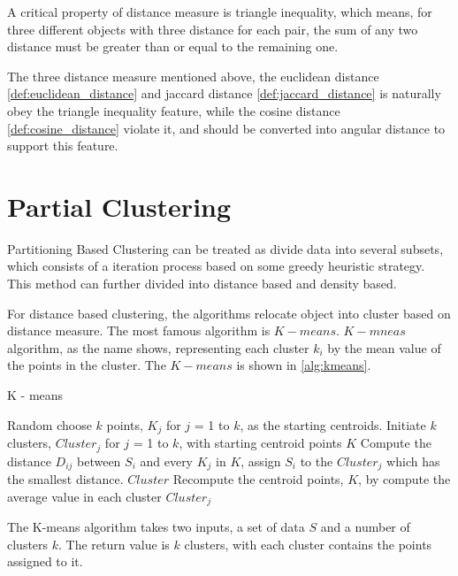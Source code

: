 \documentclass[utf8,english]{gradu3}
\begin{document}
A critical property of distance measure is triangle inequality, which means, for three different objects with three distance for each pair, the sum of any two distance must be greater than or equal to the remaining one.

The three distance measure mentioned above, the euclidean distance \ref{def:euclidean_distance} and jaccard distance \ref*{def:jaccard_distance} is naturally obey the triangle inequality feature, while the cosine distance \ref*{def:cosine_distance} violate it, and should be converted into angular distance to support this feature.

\section{Partial Clustering}

Partitioning Based Clustering can be treated as divide data into several subsets, which consists of a iteration process based on some greedy heuristic strategy. This method can further divided into distance based and density based.

For distance based clustering, the algorithms relocate object into cluster based on distance measure. The most famous algorithm is $K-means$. $K-mneas$ algorithm, as the name shows, representing each cluster $k_i$ by the mean value of the points in the cluster. The $K-means$ is shown in \ref*{alg:kmeans}.

\algrenewcommand\Return{\State \algorithmicreturn{} }%
\begin{algorithm}[h]
	\caption{K - means}
	\label{alg:kmeans}
	\begin{algorithmic}[1]
		\State Random choose $k$ points, $K_j$ for $j$ = 1 to $k$,  as the starting centroids.
		\State Initiate $k$ clusters, $Cluster_j$ for $j$ = 1 to $k$, with starting centroid points $K$
			    \State Compute the distance $D_{ij}$ between $S_i$ and every $K_j$ in $K$, assign $S_i$ to the $Cluster_j$ which has the smallest distance.
			\EndFor
				\Return $Cluster$
			\EndIf
			\State Recompute the centroid points, $K$, by compute the average value in each cluster $Cluster_j$
		\EndWhile
		\EndProcedure
		
		The K-means algorithm takes two inputs, a set of data $S$ and a number of clusters $k$. The return value is $k$ clusters, with each cluster contains the points assigned to it.
	\end{algorithmic}
\end{algorithm}
\end{document}
